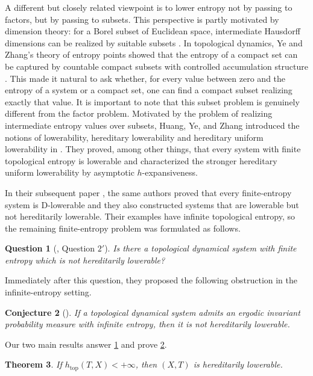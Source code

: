 \documentclass[10pt,a4paper]{amsart}
\newcommand{\htop}{h_{\mathrm{top}}}
\newtheorem{theorem}{Theorem}[section]
\newtheorem{question}[theorem]{Question}
\newtheorem{conjecture}[theorem]{Conjecture}
\numberwithin{equation}{section}
\begin{document}
	A different but closely related viewpoint is to lower entropy not by passing to factors, but by passing to subsets. This perspective is partly motivated by dimension theory: for a Borel subset of Euclidean space, intermediate Hausdorff dimensions can be realized by suitable subsets \cite{Falconer1990,Mattila1995}. In topological dynamics, Ye and Zhang's theory of entropy points showed that the entropy of a compact set can be captured by countable compact subsets with controlled accumulation structure \cite{YeZhang2007}. This made it natural to ask whether, for every value between zero and the entropy of a system or a compact set, one can find a compact subset realizing exactly that value. It is important to note that this subset problem is genuinely different from the factor problem.
	Motivated by the problem of realizing intermediate entropy values over subsets, Huang, Ye, and Zhang introduced the notions of lowerability, hereditary lowerability and hereditary uniform lowerability in \cite{HYZ2010}. They proved, among other things, that every system with finite topological entropy is lowerable and characterized the stronger hereditary uniform lowerability by asymptotic $h$-expansiveness.
	
	In their subsequent paper \cite{HYZ2014}, the same authors proved that every  finite-entropy system is D-lowerable and they also constructed systems that are lowerable but not hereditarily lowerable. Their examples have infinite topological entropy, so the remaining finite-entropy problem was formulated as follows.

	
	\begin{question}[{\cite[p.~4430]{HYZ2014}, Question $2'$}]
		\label{ques:finite}
		Is there a topological dynamical system with finite entropy which is not
		hereditarily lowerable?
	\end{question}
	
	Immediately after this question, they proposed the following obstruction in
	the infinite-entropy setting.
	
	\begin{conjecture}[{\cite[p.~4430]{HYZ2014}}]
		\label{conj:infinite}
		If a topological dynamical system admits an ergodic invariant probability
		measure with infinite entropy, then it is not hereditarily lowerable.
	\end{conjecture}
	
	Our two main results answer \cref{ques:finite} and prove
	\cref{conj:infinite}.
	
	\begin{theorem}
		\label{thm:finite-main}
		If $\htop(T,X)<+\infty$, then $(X,T)$ is hereditarily lowerable.
	\end{theorem}
	
\end{document}
